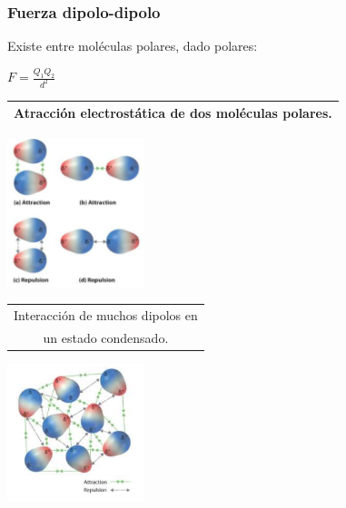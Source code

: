         \subsubsection{Fuerza dipolo-dipolo}
            Existe entre moléculas polares, dado polares:
            \begin{center} $F = \frac{Q_1 Q_2}{d^2}$ \end{center}
            \begin{center}
                \begin{tabular}{| c |}
                    \toprule
                    Atracción electrostática de dos moléculas polares. \\
                    \bottomrule
                \end{tabular}
        \end{center}
            \begin{center} \includegraphics[width=4cm]{./imagenes/atraccionElectrostaticaDosMoleculasPolares.png} \end{center}
            \begin{center}
                \begin{tabular}{| c |}
                    \toprule
                    Interacción de muchos dipolos en \\ 
                    un estado condensado. \\
                    \bottomrule
                \end{tabular}
            \end{center}
            \begin{center} \includegraphics[width=4cm]{./imagenes/dipolosEnUnEstadoGaseoso.png} \end{center}
